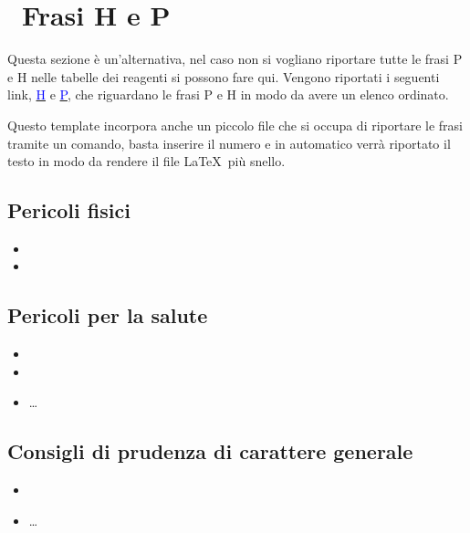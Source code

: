 \section*{\quad \   Frasi H e P}%

Questa sezione è un'alternativa, nel caso non si vogliano riportare tutte le frasi P e H nelle tabelle dei reagenti si possono fare qui.
Vengono riportati i seguenti link, \href{https://it.wikipedia.org/wiki/Indicazioni_di_pericolo_H}{\textcolor{blue}{H}} e \href{https://it.wikipedia.org/wiki/Consigli_P}{\textcolor{blue}{P}}, che riguardano le frasi P e H in modo da avere un elenco ordinato.

Questo template incorpora anche un piccolo file che si occupa di riportare le frasi tramite un comando, basta inserire il numero e in automatico verrà riportato il testo in modo da rendere il file \LaTeX\ più snello.

\begingroup
\begin{multicols}{2}
\scriptsize
\subsection*{Pericoli fisici}
\begin{itemize}
    \item {}
    \item {}
\end{itemize}
\subsection*{Pericoli per la salute}
\begin{itemize}
    \item {}
    \item {}
    \item \dots
\end{itemize}
\subsection*{Consigli di prudenza di carattere generale}
\begin{itemize}
    \item {}
    \item \dots
\end{itemize}
\end{multicols}
\endgroup


